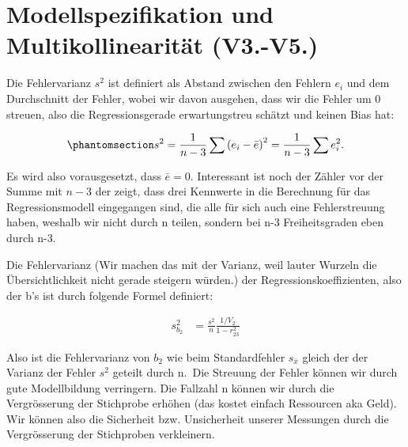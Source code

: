 \documentclass[
  10pt,
  letterpaper,
  a4paper, twoside]{scrreprt}
\begin{document}
\section{Modellspezifikation und Multikollinearität
(V3.-V5.)}\label{modellspezifikation-und-multikollinearituxe4t-v3.-v5.}

\begin{tcolorbox}[enhanced jigsaw, coltitle=black, opacitybacktitle=0.6, toptitle=1mm, colbacktitle=quarto-callout-warning-color!10!white, colback=white, toprule=.15mm, opacityback=0, bottomrule=.15mm, arc=.35mm, colframe=quarto-callout-warning-color-frame, leftrule=.75mm, titlerule=0mm, breakable, left=2mm, rightrule=.15mm, title={IYI (∉ Klausur): Standardfehler steigen bei Multikollinearität}, bottomtitle=1mm]

Die Fehlervarianz \(s^2\) ist definiert als Abstand zwischen den Fehlern
\(e_i\) und dem Durchschnitt der Fehler, wobei wir davon ausgehen, dass
wir die Fehler um 0 streuen, also die Regressionsgerade erwartungstreu
schätzt und keinen Bias hat:

\begin{equation}\phantomsection\label{eq-2.151}{
s^2=\frac{1}{n-3} \sum\left(e_i-\bar{e}\right)^2=\frac{1}{n-3} \sum e_i^2 .
}\end{equation}

Es wird also vorausgesetzt, dass \(\bar{e}=0\). Interessant ist noch der
Zähler vor der Summe mit \(n-3\) der zeigt, dass drei Kennwerte in die
Berechnung für das Regressionsmodell eingegangen sind, die alle für sich
auch eine Fehlerstreuung haben, weshalb wir nicht durch n teilen,
sondern bei n-3 Freiheitsgraden eben durch n-3.

Die Fehlervarianz (Wir machen das mit der Varianz, weil lauter Wurzeln
die Übersichtlichkeit nicht gerade steigern würden.) der
Regressionskoeffizienten, also der b's ist durch folgende Formel
definiert:

\begin{align} 
s_{b_2}^2&=\frac{s^2}{n} \frac{1 / V_2}{1-r_{23}^2} \label{eq-2.152}
\end{align}

Also ist die Fehlervarianz von \(b_2\) wie beim Standardfehler
\(s_{\bar{x}}\) gleich der der Varianz der Fehler \(s^2\) geteilt durch
n.~Die Streuung der Fehler können wir durch gute Modellbildung
verringern. Die Fallzahl n können wir durch die Vergrösserung der
Stichprobe erhöhen (das kostet einfach Ressourcen aka Geld). Wir können
also die Sicherheit bzw. Unsicherheit unserer Messungen durch die
Vergrösserung der Stichproben verkleinern.


\end{tcolorbox}
\end{document}
